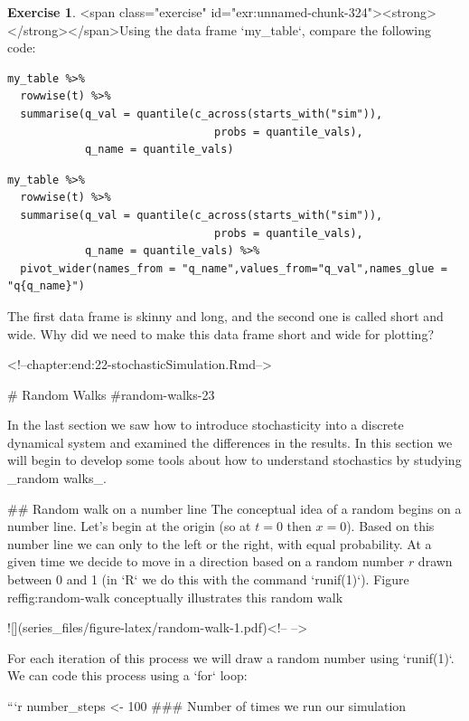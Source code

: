 \documentclass[
]{book}
\theoremstyle{definition}
\theoremstyle{definition}
\theoremstyle{definition}
\newtheorem{exercise}{Exercise}[chapter]
\theoremstyle{remark}
\begin{document}
\begin{exercise}
<span class="exercise" id="exr:unnamed-chunk-324"><strong>\label{exr:unnamed-chunk-324} </strong></span>Using the data frame `my_table`, compare the following code:
\begin{verbatim}
my_table %>%
  rowwise(t) %>%
  summarise(q_val = quantile(c_across(starts_with("sim")),
                                probs = quantile_vals),
            q_name = quantile_vals)
\end{verbatim}

\begin{verbatim}
my_table %>%
  rowwise(t) %>%
  summarise(q_val = quantile(c_across(starts_with("sim")),
                                probs = quantile_vals),
            q_name = quantile_vals) %>%
  pivot_wider(names_from = "q_name",values_from="q_val",names_glue = "q{q_name}")
\end{verbatim}

The first data frame is skinny and long, and the second one is called short and wide. Why did we need to make this data frame short and wide for plotting?
\end{exercise}





<!--chapter:end:22-stochasticSimulation.Rmd-->

# Random Walks {#random-walks-23}

In the last section we saw how to introduce stochasticity into a discrete dynamical system and examined the differences in the results.  In this section we will begin to develop some tools about how to understand stochastics by studying _random walks_.

## Random walk on a number line
The conceptual idea of a random begins on a number line.  Let's begin at the origin (so at $t=0$ then $x=0$).  Based on this number line we can only to the left or the right, with equal probability.  At a given time we decide to move in a direction based on a random number $r$ drawn between 0 and 1 (in `R` we do this with the command `runif(1)`).  Figure \\ref{fig:random-walk} conceptually illustrates this random walk

![](series_files/figure-latex/random-walk-1.pdf)<!-- --> 


For each iteration of this process we will draw a random number using `runif(1)`.  We can code this process using a `for` loop:


```r
number_steps <- 100     ### Number of times we run our simulation
\end{document}
